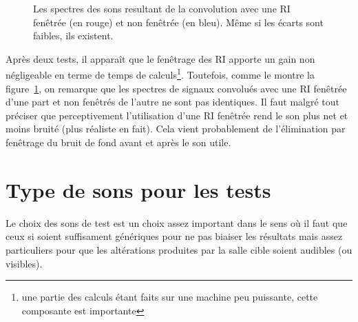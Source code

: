 \begin{figure}[h!]
\caption{\label{spectres_recoupage}Les spectres des sons resultant de la convolution avec une RI fenêtrée (en rouge) et
non fenêtrée (en bleu). Même si les écarts sont faibles, ils existent.}
\end{figure}

Après deux tests, il apparaît que le fenêtrage des RI apporte un gain non négligeable en terme de temps de
calculs\footnote{une partie des calculs étant faits sur une machine peu puissante, cette composante est importante}.
Toutefois, comme le montre la figure~\ref{spectres_recoupage}, on remarque que les spectres de signaux convolués avec
une RI fenêtrée d'une part et non fenêtrés de l'autre ne sont pas identiques. Il faut malgré tout préciser que
perceptivement l'utilisation d'une RI fenêtrée rend le son plus net et moins bruité (plus réaliste en fait). Cela vient
probablement de l'élimination par fenêtrage du bruit de fond avant et après le son utile.

\section{Type de sons pour les tests} %

Le choix des sons de test est un choix assez important dans le sens où il faut que ceux si soient suffisament génériques
pour ne pas biaiser les résultats mais assez particuliers pour que les altérations produites par la salle cible soient
audibles (ou visibles).

